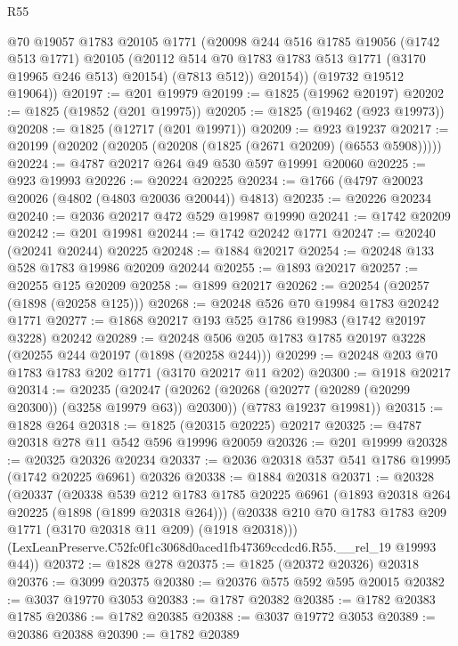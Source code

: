 \begin{lexlean}{R55}
\begin{coremodule}
          @70
          @19057
          @1783
          @20105
          @1771
          (@20098
            @244
            @516
            @1785
            @19056
            (@1742 @513 @1771)
            @20105
            (@20112 @514 @70 @1783 @1783 @513 @1771 (@3170 @19965 @246 @513) @20154)
            (@7813 @512))
          @20154))
      (@19732 @19512 @19064))
@20197 := @201 @19979
@20199 := @1825 (@19962 @20197)
@20202 := @1825 (@19852 (@201 @19975))
@20205 := @1825 (@19462 (@923 @19973))
@20208 := @1825 (@12717 (@201 @19971))
@20209 := @923 @19237
@20217 := @20199 (@20202 (@20205 (@20208 (@1825 (@2671 @20209) (@6553 @5908)))))
@20224 := @4787 @20217 @264 @49 @530 @597 @19991 @20060
@20225 := @923 @19993
@20226 := @20224 @20225
@20234 := @1766 (@4797 @20023 @20026 (@4802 (@4803 @20036 @20044)) @4813)
@20235 := @20226 @20234
@20240 := @2036 @20217 @472 @529 @19987 @19990
@20241 := @1742 @20209
@20242 := @201 @19981
@20244 := @1742 @20242 @1771
@20247 := @20240 (@20241 @20244) @20225
@20248 := @1884 @20217
@20254 := @20248 @133 @528 @1783 @19986 @20209 @20244
@20255 := @1893 @20217
@20257 := @20255 @125 @20209
@20258 := @1899 @20217
@20262 := @20254 (@20257 (@1898 (@20258 @125)))
@20268 := @20248 @526 @70 @19984 @1783 @20242 @1771
@20277 := @1868 @20217 @193 @525 @1786 @19983 (@1742 @20197 @3228) @20242
@20289 := @20248 @506 @205 @1783 @1785 @20197 @3228 (@20255 @244 @20197 (@1898 (@20258 @244)))
@20299 := @20248 @203 @70 @1783 @1783 @202 @1771 (@3170 @20217 @11 @202)
@20300 := @1918 @20217
@20314 := @20235
    (@20247
      (@20262 (@20268 (@20277 (@20289 (@20299 @20300)) (@3258 @19979 @63)) @20300))
      (@7783 @19237 @19981))
@20315 := @1828 @264
@20318 := @1825 (@20315 @20225) @20217
@20325 := @4787 @20318 @278 @11 @542 @596 @19996 @20059
@20326 := @201 @19999
@20328 := @20325 @20326 @20234
@20337 := @2036 @20318 @537 @541 @1786 @19995 (@1742 @20225 @6961) @20326
@20338 := @1884 @20318
@20371 := @20328
    (@20337
      (@20338
        @539
        @212
        @1783
        @1785
        @20225
        @6961
        (@1893 @20318 @264 @20225 (@1898 (@1899 @20318 @264)))
        (@20338 @210 @70 @1783 @1783 @209 @1771 (@3170 @20318 @11 @209) (@1918 @20318)))
      (LexLeanPreserve.C52fc0f1c3068d0aced1fb47369ccdcd6.R55.__rel_19 @19993 @44))
@20372 := @1828 @278
@20375 := @1825 (@20372 @20326) @20318
@20376 := @3099 @20375
@20380 := @20376 @575 @592 @595 @20015
@20382 := @3037 @19770 @3053
@20383 := @1787 @20382
@20385 := @1782 @20383 @1785
@20386 := @1782 @20385
@20388 := @3037 @19772 @3053
@20389 := @20386 @20388
@20390 := @1782 @20389

\end{coremodule}
\end{lexlean}
